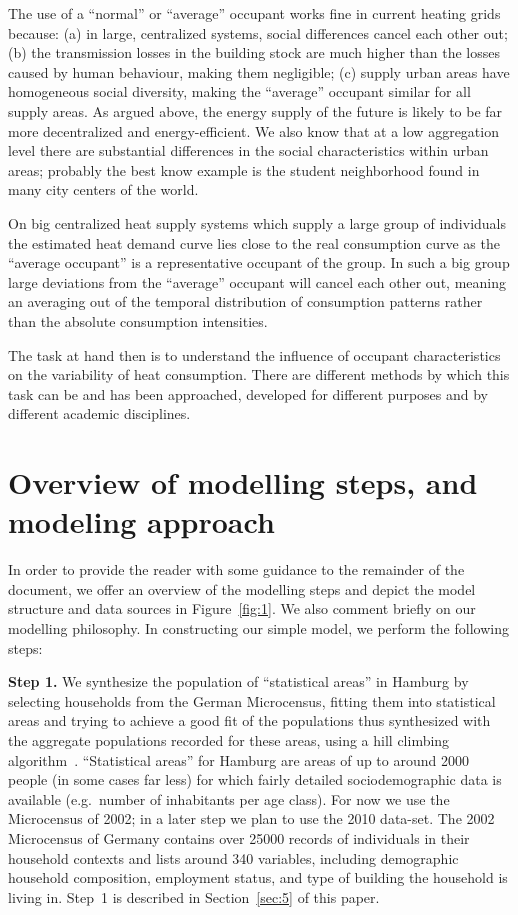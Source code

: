 \documentclass[11pt]{IJM-article}
\begin{document}
The use of a ``normal'' or ``average'' occupant works fine in current heating
grids because: (a) in large, centralized systems, social differences cancel
each other out; (b) the transmission losses in the building stock are much
higher than the losses caused by human behaviour, making them negligible; (c)
supply urban areas have homogeneous social diversity, making the ``average''
occupant similar for all supply areas. As argued above, the energy supply of
the future is likely to be far more decentralized  and
energy-efficient.  We also know that at a low aggregation level there are
substantial differences in the social characteristics within urban areas;
probably the best know example is the student neighborhood found in many city
centers of the world.

On big centralized heat supply systems which supply a large group of
individuals the estimated heat demand curve lies close to the real consumption
curve as the ``average occupant'' is a representative occupant of the group. In
such a big group large deviations from the ``average'' occupant will cancel
each other out, meaning an averaging out of the temporal distribution of
consumption patterns rather than the absolute consumption intensities.

The task at hand then is to understand the influence of occupant
characteristics on the variability of heat consumption. There are different
methods by which this task can be and has been approached, developed for
different purposes and by different academic disciplines.

\section{Overview of modelling steps, and modeling approach}\label{sec:2}

In order to provide the reader with some guidance to the remainder of the
document, we offer an overview of the modelling steps and depict the model
structure and data sources in Figure~\ref{fig:1}.  We also comment briefly on
our modelling philosophy. In constructing our simple model, we perform the
following steps:

\textbf{Step 1.} We synthesize the population of ``statistical areas'' in
Hamburg by selecting households from the German Microcensus, fitting them into
statistical areas and trying to achieve a good fit of the populations thus
synthesized with the aggregate populations recorded for these areas, using a
hill climbing algorithm~\cite{Williamson.1998}. ``Statistical areas'' for
Hamburg are areas of up to around 2000 people (in some cases far less) for
which fairly detailed sociodemographic data is available (e.g.\ number of
inhabitants per age class). For now we use the Microcensus of 2002; in a later
step we plan to use the 2010 data-set. The 2002 Microcensus of Germany contains
over 25000 records of individuals in their household contexts and lists around
340 variables, including demographic household composition, employment status,
and type of building the household is living in. Step~1 is described in
Section~\ref{sec:5} of this paper.
\end{document}
